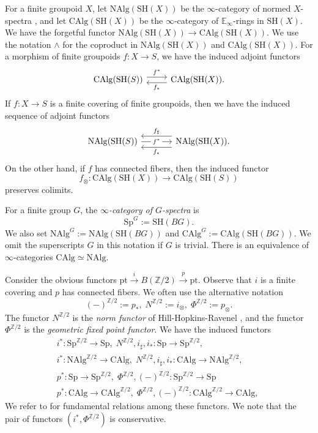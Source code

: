 \documentclass[10pt]{amsart}
\theoremstyle{definition}
\theoremstyle{remark}
\numberwithin{equation}{section}
\newcommand{\E}{\mathbb{E}}
\newcommand{\Sp}{\mathrm{Sp}}
\newcommand{\CAlg}{\mathrm{CAlg}}
\newcommand{\NAlg}{\mathrm{NAlg}}
\newcommand{\pt}{\mathrm{pt}}
\newcommand{\SH}{\mathrm{SH}}
\newcommand{\Ztwo}{{\mathbb{Z}/2}}
\begin{document}
For a finite groupoid $X$,
let $\NAlg(\SH(X))$ be the $\infty$-category of normed $X$-spectra \cite[Definition 9.14]{BH21},
and let $\CAlg(\SH(X))$ be the $\infty$-category of $\E_\infty$-rings in $\SH(X)$.
We have the forgetful functor $\NAlg(\SH(X))\to \CAlg(\SH(X))$.
We use the notation $\wedge$ for the coproduct in $\NAlg(\SH(X))$ and $\CAlg(\SH(X))$.
For a morphism of finite groupoids $f\colon X\to S$,
we have the induced adjoint functors
\[
\begin{tikzcd}
\CAlg(\SH(S))
\ar[r,shift left=0.75ex,"f^*"]
\ar[r,shift right=0.75ex,"f_*"',leftarrow]
&
\CAlg(\SH(X)).
\end{tikzcd}
\]
If $f\colon X\to S$ is a finite covering of finite groupoids,
then we have the induced sequence of adjoint functors
\[
\begin{tikzcd}[column sep=large]
\NAlg(\SH(S))
\ar[r,shift left=1.5ex,leftarrow,"f_\sharp"]
\ar[r,"f^*" description]
\ar[r,"f_*"',shift right=1.5ex,leftarrow]
&
\NAlg(\SH(X)).
\end{tikzcd}
\]
On the other hand,
if $f$ has connected fibers,
then the induced functor
\[
f_\otimes \colon \CAlg(\SH(X))\to \CAlg(\SH(S))
\]
preserves colimits.

For a finite group $G$,
the \emph{$\infty$-category of $G$-spectra} is
\[
\Sp^G
:=
\SH(B G).
\]
We also set $\NAlg^G:=\NAlg(\SH(B G))$ and $\CAlg^G:=\CAlg(\SH(B G))$.
We omit the superscripts $G$ in this notation if $G$ is trivial.
There is an equivalence of $\infty$-categories $\CAlg\simeq \NAlg$.

Consider the obvious functors $\pt \xrightarrow{i} B (\Ztwo) \xrightarrow{p} \pt$.
Observe that $i$ is a finite covering and $p$ has connected fibers.
We often use the alternative notation
\[
(-)^{\Ztwo}
:=
p_*,
\;
N^{\Ztwo}
:=
i_\otimes,
\;
\Phi^{\Ztwo}
:=
p_\otimes.
\]
The functor $N^{\Ztwo}$ is the \emph{norm functor} of Hill-Hopkins-Ravenel \cite{HHR},
and the functor $\Phi^{\Ztwo}$ is the \emph{geometric fixed point functor}.
We have the induced functors
\begin{gather*}
i^*\colon \Sp^{\Ztwo} \to \Sp,
\;
N^{\Ztwo},i_\sharp,i_* \colon \Sp\to \Sp^{\Ztwo},
\\
i^*\colon \NAlg^{\Ztwo} \to \CAlg,
\;
N^{\Ztwo},i_\sharp,i_* \colon \CAlg\to \NAlg^{\Ztwo},
\\
p^*\colon \Sp\to \Sp^{\Ztwo},
\;
\Phi^{\Ztwo},(-)^{\Ztwo} \colon \Sp^{\Ztwo}\to \Sp
\\
p^*\colon \CAlg\to \CAlg^{\Ztwo},
\;
\Phi^{\Ztwo},(-)^{\Ztwo} \colon \CAlg^{\Ztwo}\to \CAlg,
\;
\end{gather*}
We refer to \cite[Proposition A.2.7]{THR} for fundamental relations among these functors.
We note that the pair of functors $(i^*,\Phi^{\Ztwo})$ is conservative.
\end{document}
